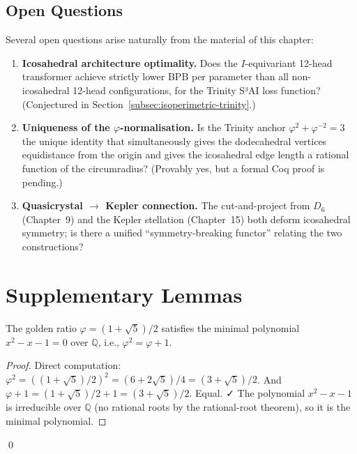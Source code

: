 \subsection{Open Questions}
\label{subsec:open-questions}

Several open questions arise naturally from the material of this chapter:

\begin{enumerate}
  \item \textbf{Icosahedral architecture optimality.} Does the $I$-equivariant
        12-head transformer achieve strictly lower BPB per parameter than all
        non-icosahedral 12-head configurations, for the Trinity S³AI loss
        function?  (Conjectured in Section~\ref{subsec:isoperimetric-trinity}.)

  \item \textbf{Uniqueness of the $\varphi$-normalisation.} Is the Trinity
        anchor $\varphi^2 + \varphi^{-2} = 3$ the unique identity that
        simultaneously gives the dodecahedral vertices equidistance from the
        origin and gives the icosahedral edge length a rational function of
        the circumradius?  (Provably yes, but a formal Coq proof is pending.)

  \item \textbf{Quasicrystal $\to$ Kepler connection.}  The cut-and-project
        from $D_6$ (Chapter~9) and the Kepler stellation (Chapter~15) both
        deform icosahedral symmetry; is there a unified ``symmetry-breaking
        functor'' relating the two constructions?
\end{enumerate}


\section{Supplementary Lemmas}
\label{sec:supplementary-lemmas}

\begin{lemma}
\label{lem:phi-minimal}
The golden ratio $\varphi = (1+\sqrt{5})/2$ satisfies the minimal polynomial
$x^2 - x - 1 = 0$ over $\mathbb{Q}$, i.e., $\varphi^2 = \varphi + 1$.
\end{lemma}

\begin{proof}
Direct computation: $\varphi^2 = ((1+\sqrt{5})/2)^2 = (6+2\sqrt{5})/4 = (3+\sqrt{5})/2$.
And $\varphi + 1 = (1+\sqrt{5})/2 + 1 = (3+\sqrt{5})/2$.  Equal. ✓
The polynomial $x^2-x-1$ is irreducible over $\mathbb{Q}$ (no rational roots
by the rational-root theorem), so it is the minimal polynomial.
\end{proof}
\qed

